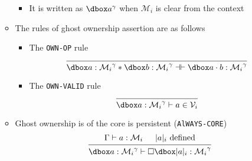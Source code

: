 \begin{itemize}
\begin{itemize}
\begin{itemize}
    	\item It is written as $\dboxed{a}^\gamma$ when $\mathcal M_i$ is clear from the context
    \end{itemize}
  \item The rules of ghost ownership assertion are as follows
  \begin{itemize}
  	\item The \texttt{OWN-OP} rule
    \[
    \begin{prooftree} 
      \infer0{\dboxed{a:\mathcal M_i}^\gamma * \dboxed{b: \mathcal M_i}^\gamma \dashv \vdash \dboxed{a \cdot b : \mathcal M_i}^\gamma} 
    \end{prooftree}
    \]
  	\item The \texttt{OWN-VALID} rule
    \[
    \begin{prooftree} 
      \infer0{\dboxed{a: \mathcal M_i}^\gamma \vdash a \in \mathcal V_i} 
    \end{prooftree}
    \]
  \end{itemize}
  \item Ghost ownership is of the core is persistent (\texttt{AlWAYS-CORE})
  \[
  \begin{prooftree} 
    \hypo{\Gamma \vdash a : \mathcal M_i}
    \hypo{|a|_i \text{ defined}}
    \infer2{\dboxed{a: \mathcal M_i}^\gamma \vdash \square \dboxed{|a|_i : \mathcal M_i}^\gamma}
  \end{prooftree}
  \]
  \end{itemize}
\end{itemize}

